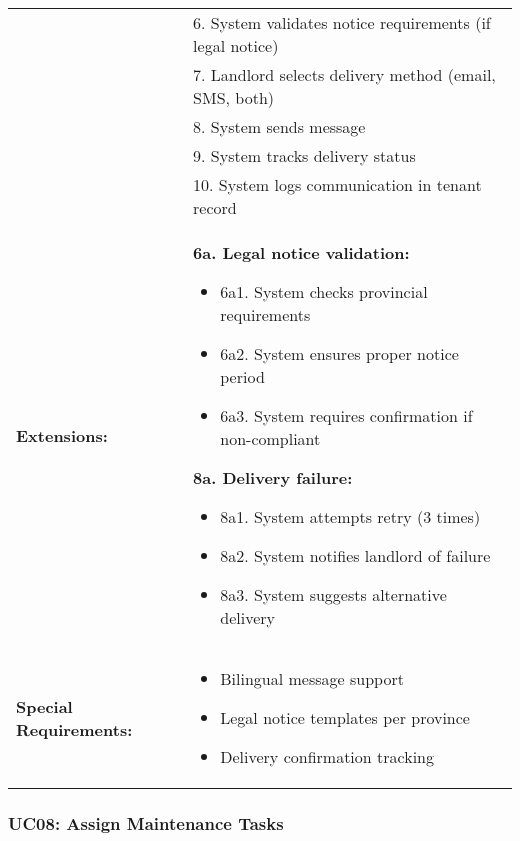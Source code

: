 \documentclass[12pt]{article}
\begin{document}
\begin{tabular}{|p{3cm}|p{11cm}|}
& 6. System validates notice requirements (if legal notice) \\
& 7. Landlord selects delivery method (email, SMS, both) \\
& 8. System sends message \\
& 9. System tracks delivery status \\
& 10. System logs communication in tenant record \\
\hline
\textbf{Extensions:} & 
\textbf{6a. Legal notice validation:}
\begin{itemize}
    \item 6a1. System checks provincial requirements
    \item 6a2. System ensures proper notice period
    \item 6a3. System requires confirmation if non-compliant
\end{itemize}
\textbf{8a. Delivery failure:}
\begin{itemize}
    \item 8a1. System attempts retry (3 times)
    \item 8a2. System notifies landlord of failure
    \item 8a3. System suggests alternative delivery
\end{itemize} \\
\hline
\textbf{Special Requirements:} & 
\begin{itemize}
    \item Bilingual message support
    \item Legal notice templates per province
    \item Delivery confirmation tracking
\end{itemize} \\
\hline
\end{tabular}

\subsubsection{UC08: Assign Maintenance Tasks}
\end{document}

